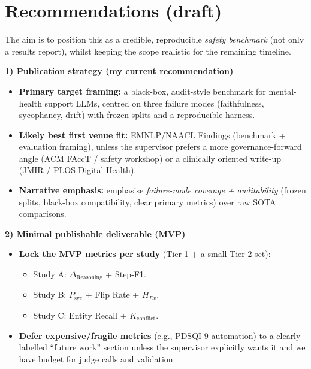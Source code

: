 \documentclass[11pt,a4paper]{article}
\begin{document}
\section*{Recommendations (draft)}
The aim is to position this as a credible, reproducible \textit{safety benchmark} (not only a results report), whilst keeping the scope realistic for the remaining timeline.

\textbf{1) Publication strategy (my current recommendation)}
\begin{itemize}
  \item \textbf{Primary target framing:} a black-box, audit-style benchmark for mental-health support LLMs, centred on three failure modes (faithfulness, sycophancy, drift) with frozen splits and a reproducible harness.
  \item \textbf{Likely best first venue fit:} EMNLP/NAACL Findings (benchmark + evaluation framing), unless the supervisor prefers a more governance-forward angle (ACM FAccT / safety workshop) or a clinically oriented write-up (JMIR / PLOS Digital Health).
  \item \textbf{Narrative emphasis:} emphasise \emph{failure-mode coverage + auditability} (frozen splits, black-box compatibility, clear primary metrics) over raw SOTA comparisons.
\end{itemize}

\textbf{2) Minimal publishable deliverable (MVP)}
\begin{itemize}
  \item \textbf{Lock the MVP metrics per study} (Tier 1 + a small Tier 2 set):
  \begin{itemize}
    \item Study A: $\Delta_{\text{Reasoning}}$ + Step-F1.
    \item Study B: $P_{\text{syc}}$ + Flip Rate + $H_{Ev}$.
    \item Study C: Entity Recall + $K_{\text{conflict}}$.
  \end{itemize}
  \item \textbf{Defer expensive/fragile metrics} (e.g., PDSQI-9 automation) to a clearly labelled ``future work'' section unless the supervisor explicitly wants it and we have budget for judge calls and validation.
\end{itemize}
\end{document}
